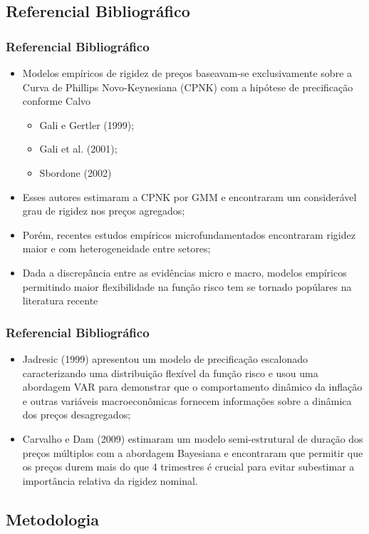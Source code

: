 \documentclass[aspectratio=169]{beamer}
\begin{document}
\subsection{Referencial Bibliográfico}

\begin{frame}\frametitle{Referencial Bibliográfico}
  \begin{itemize}
  \item Modelos empíricos de rigidez de preços baseavam-se exclusivamente sobre a Curva de Phillips Novo-Keynesiana (CPNK) com a hipótese de precificação conforme Calvo
    \begin{itemize}
      \item Gali e Gertler (1999);
      \item Gali et al. (2001);
      \item Sbordone (2002)
    \end{itemize}
  \item Esses autores estimaram a CPNK por GMM e encontraram um considerável grau de rigidez nos preços agregados;
  \item Porém, recentes estudos empíricos microfundamentados encontraram rigidez maior e com heterogeneidade entre setores;
  \item Dada a discrepância entre as evidências micro e macro, modelos empíricos permitindo maior flexibilidade na função risco tem se tornado popúlares na literatura recente
  \end{itemize}
\end{frame}

\begin{frame}\frametitle{Referencial Bibliográfico}
  \begin{itemize}[<+->]
  \item Jadresic (1999) apresentou um modelo de precificação escalonado caracterizando uma distribuição flexível da função risco e usou uma abordagem VAR para demonstrar que o comportamento dinâmico da inflação e outras variáveis macroeconômicas fornecem informações sobre a dinâmica dos preços desagregados;
  \item Carvalho e Dam (2009) estimaram um modelo semi-estrutural de duração dos preços múltiplos com a abordagem Bayesiana e encontraram que permitir que os preços durem mais do que 4 trimestres é crucial para evitar subestimar a importância relativa da rigidez nominal.
   \end{itemize}
\end{frame}

\subsection{Metodologia}
\end{document}
